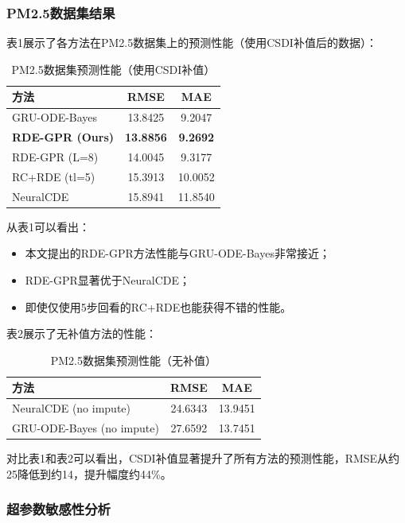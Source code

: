 \documentclass[12pt,a4paper]{article}
\begin{document}
\subsubsection{PM2.5数据集结果}

表1展示了各方法在PM2.5数据集上的预测性能（使用CSDI补值后的数据）：
\begin{table}[H]
    \centering
    \caption{PM2.5数据集预测性能（使用CSDI补值）}
    \label{tab:pm25_results}
    \begin{tabular}{lcc}
        \toprule
        方法 & RMSE & MAE \\
        \midrule
        GRU-ODE-Bayes & 13.8425 & 9.2047 \\
        \textbf{RDE-GPR (Ours)} & \textbf{13.8856} & \textbf{9.2692} \\
        RDE-GPR (L=8) & 14.0045 & 9.3177 \\
        RC+RDE (tl=5) & 15.3913 & 10.0052 \\
        NeuralCDE & 15.8941 & 11.8540 \\
        \bottomrule
    \end{tabular}
\end{table}

从表1可以看出：
\begin{itemize}
    \item 本文提出的RDE-GPR方法性能与GRU-ODE-Bayes非常接近；
    \item RDE-GPR显著优于NeuralCDE；
    \item 即使仅使用5步回看的RC+RDE也能获得不错的性能。
\end{itemize}

表2展示了无补值方法的性能：
\begin{table}[H]
    \centering
    \caption{PM2.5数据集预测性能（无补值）}
    \label{tab:pm25_noimpute}
    \begin{tabular}{lcc}
        \toprule
        方法 & RMSE & MAE \\
        \midrule
        NeuralCDE (no impute) & 24.6343 & 13.9451 \\
        GRU-ODE-Bayes (no impute) & 27.6592 & 13.7451 \\
        \bottomrule
    \end{tabular}
\end{table}

对比表1和表2可以看出，CSDI补值显著提升了所有方法的预测性能，RMSE从约25降低到约14，提升幅度约44\%。

\subsubsection{超参数敏感性分析}
\end{document}
